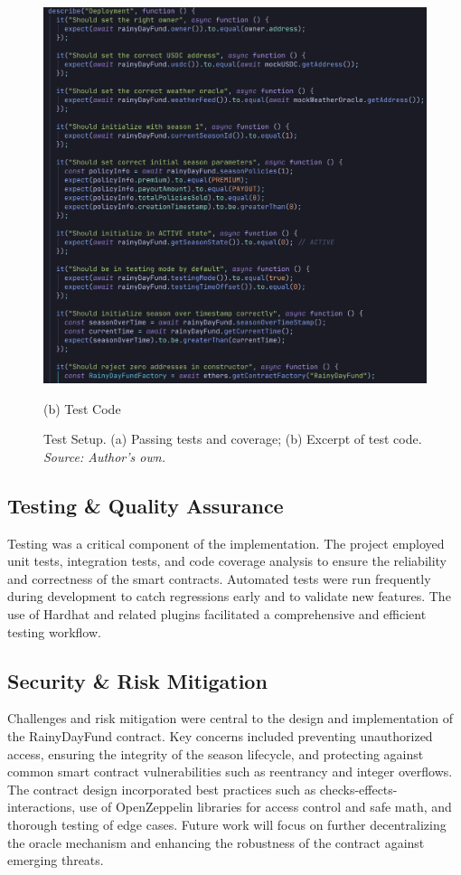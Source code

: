 \documentclass[11pt,a4paper]{article}
\begin{document}
\begin{figure}[H]
\begin{minipage}[b]{0.48\textwidth}
            \includegraphics[width=0.95\linewidth]{graphics/Test_Code}
            \caption*{(b) Test Code}
        \end{minipage}
        \caption{Test Setup. (a) Passing tests and coverage; (b) Excerpt of test code. \\ \textit{Source: Author's own.}}
        \label{fig:test-set-up}
    \end{figure}

    \subsection{Testing \& Quality Assurance}\label{subsec:testing-qa}
    Testing was a critical component of the implementation.
    The project employed unit tests, integration tests, and code coverage analysis to ensure the reliability and correctness of the smart contracts.
    Automated tests were run frequently during development to catch regressions early and to validate new features.
    The use of Hardhat and related plugins facilitated a comprehensive and efficient testing workflow.

    \subsection{Security \& Risk Mitigation}\label{subsec:security-risk}
    Challenges and risk mitigation were central to the design and implementation of the RainyDayFund contract.
    Key concerns included preventing unauthorized access, ensuring the integrity of the season lifecycle, and protecting against common smart contract vulnerabilities such as reentrancy and integer overflows.
    The contract design incorporated best practices such as checks-effects-interactions, use of OpenZeppelin libraries for access control and safe math, and thorough testing of edge cases.
    Future work will focus on further decentralizing the oracle mechanism and enhancing the robustness of the contract against emerging threats.
\end{document}
